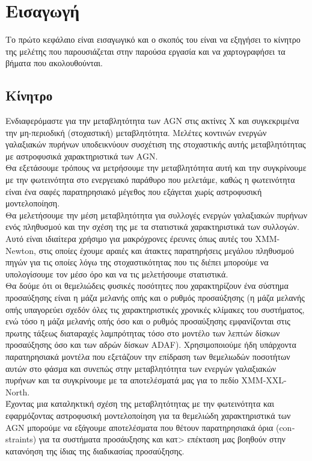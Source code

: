 \chapter{Εισαγωγή} \label{introduction}

Το πρώτο κεφάλαιο είναι εισαγωγικό και ο σκοπός του είναι να εξηγήσει το κίνητρο της μελέτης που παρουσιάζεται στην παρούσα εργασία και να χαρτογραφήσει τα βήματα που ακολουθούνται.



\section{Κίνητρο}

Ενδιαφερόμαστε για την μεταβλητότητα των \textlatin{AGN} στις ακτίνες Χ και συγκεκριμένα την μη-περιοδική (στοχαστική) μεταβλητότητα. Μελέτες κοντινών ενεργών γαλαξιακών πυρήνων υποδεικνύουν συσχέτιση της στοχαστικής αυτής μεταβλητότητας με αστροφυσικά χαρακτηριστικά των \textlatin{AGN}. \\
Θα εξετάσουμε τρόπους να μετρήσουμε την μεταβλητότητα αυτή και την συγκρίνουμε με την φωτεινότητα στο ενεργειακό παράθυρο που μελετάμε, καθώς η φωτεινότητα είναι ένα σαφές παρατηρησιακό μέγεθος που εξάγεται χωρίς αστροφυσική μοντελοποίηση. \\
Θα μελετήσουμε την μέση μεταβλητότητα για συλλογές ενεργών γαλαξιακών πυρήνων ενός πληθυσμού και την σχέση της με τα στατιστικά χαρακτηριστικά των συλλογών. Αυτό είναι ιδιαίτερα χρήσιμο για μακρόχρονες έρευνες όπως αυτές του \textlatin{XMM-Newton}, στις οποίες έχουμε αραιές και άτακτες παρατηρήσεις μεγάλου πληθυσμού πηγών για τις οποίες λόγω της στοχαστικότητας που τις διέπει μπορούμε να υπολογίσουμε τον μέσο όρο και να τις μελετήσουμε στατιστικά.\\
Θα δούμε ότι οι θεμελιώδεις φυσικές ποσότητες που χαρακτηρίζουν ένα σύστημα προσαύξησης είναι η μάζα μελανής οπής και ο ρυθμός προσαύξησης (η μάζα μελανής οπής υπαγορεύει σχεδόν όλες τις χαρακτηριστικές χρονικές κλίμακες του συστήματος, ενώ τόσο η μάζα μελανής οπής όσο και ο ρυθμός προσαύξησης εμφανίζονται στις πρωτης τάξεως διαταραχές λαμπρότητας τόσο στο μοντέλο των λεπτών δίσκων προσαύξησης όσο και των αδρών δίσκων \textlatin{ADAF}). Χρησιμοποιούμε ήδη υπάρχοντα παρατηρησιακά μοντέλα που εξετάζουν την επίδραση των θεμελιωδών ποσοτήτων αυτών στο φάσμα και συνεπώς στην μεταβλητότητα των ενεργών γαλαξιακών πυρήνων και τα συγκρίνουμε με τα αποτελέσματά μας για το πεδίο \textlatin{XMM-XXL-North}. \\
Έχοντας μια καταληκτική σχέση της μεταβλητότητας με την φωτεινότητα και εφαρμόζοντας αστροφυσική μοντελοποίηση για τα θεμελιώδη χαρακτηριστικά των \textlatin{AGN} μπορούμε να εξάγουμε αποτελέσματα που θέτουν παρατηρησιακά όρια (\textlatin{constraints}) για τα συστήματα προσάυξησης και κατ> επέκταση μας βοηθούν στην κατανόηση της ίδιας της διαδικασίας προσαύξησης.

